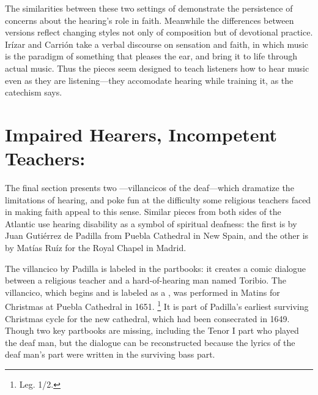 The similarities between these two settings of  demonstrate the persistence of concerns about the hearing's role in faith.
Meanwhile the differences between versions reflect changing styles not only of composition but of devotional practice.
Irízar and Carrión take a verbal discourse on sensation and faith, in which music is the paradigm of something that pleases the ear, and bring it to life through actual music.
Thus the pieces seem designed to teach listeners how to hear music even as they are listening---they accomodate hearing while training it, as the catechism says.


\section{Impaired Hearers, Incompetent Teachers: }

The final section presents two ---villancicos of the deaf---which dramatize the limitations of hearing, and poke fun at the difficulty some religious teachers faced in making faith appeal to this sense.
Similar pieces from both sides of the Atlantic use hearing disability as a symbol of spiritual deafness: the first is by Juan Gutiérrez de Padilla from Puebla Cathedral in New Spain, and the other is by Matías Ruíz for the Royal Chapel in Madrid.

The villancico by Padilla is labeled  in the partbooks: it creates a comic dialogue between a religious teacher and a hard-of-hearing man named Toribio.
The villancico, which begins  and is labeled as a , was performed in Matins for Christmas at Puebla Cathedral in 1651.%
\footnote{\signature{MEX-Pc}{Leg. 1/2}.}
It is part of Padilla's earliest surviving Christmas cycle for the new cathedral, which had been consecrated in 1649.
Though two key partbooks are missing, including the Tenor I part who played the deaf man, but the dialogue can be reconstructed because the lyrics of the deaf man's part were written in the surviving bass part.


